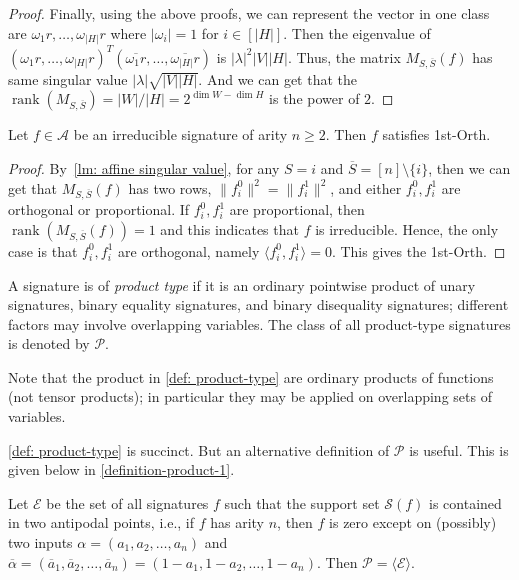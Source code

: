 \begin{proof}
   Finally, using the above proofs, we can represent the vector in one class are $\omega_1r,\dots,\omega_{|H|}r$ where $|\omega_i|=1$ for $i\in [|H|]$. Then the eigenvalue of $(\omega_1r,\dots,\omega_{|H|}r)^T(\overline{\omega_1r},\dots,\overline{\omega_{|H|}r})$ is $|\lambda|^2|V||H|$. Thus, the matrix $M_{S,\overline{S}}(f)$ has same singular value $|\lambda|\sqrt{|V||H|}$. And we can get that the $\operatorname{rank}(M_{S,\overline{S}})=|W|/|H|=2^{\dim W-\dim H}$ is the power of $2$.
    
\end{proof}

\begin{lemma}\label{lm: affine is 1st-orth}
    Let $f\in \mathscr{A}$ be an irreducible signature of arity $n\ge 2$.
    Then $f$ satisfies {\sc 1st-Orth}.
\end{lemma}
\begin{proof}
    By~\cref{lm: affine singular value}, for any $S={i}$ and $\overline{S}=[n]\setminus \{i\}$, then we can get that $M_{S,\overline{S}}(f)$ has two rows, $\|f_i^0\|^2=\|f_i^1\|^2$, and either $f_i^0,f_i^1$ are orthogonal or proportional. If $f_i^0,f_i^1$ are proportional, then $\operatorname{rank}(M_{S,\overline{S}}(f))=1$ and this indicates that $f$ is irreducible. Hence, the only case is that $f_i^0,f_i^1$ are orthogonal, namely $\langle f_i^0,f_i^1\rangle=0$. This gives the {\sc 1st-Orth}.
\end{proof}

\begin{definition}\label{def: product-type}
A signature is of \emph{product type} if it is an ordinary pointwise
product of unary signatures, binary equality signatures, and binary
disequality signatures; different factors may involve overlapping
variables.  The class of all product-type signatures is denoted by
$\mathscr P$.
\end{definition}

Note that the product in \cref{def: product-type} are ordinary products of functions (not tensor products); in particular they may be applied on overlapping sets of variables.

\cref{def: product-type} is succinct.
But an alternative definition of $\mathscr{P}$ is
useful. This is given below in \cref{definition-product-1}.
\begin{definition}\label{definition-product-1}
Let $\mathcal{E}$ be the set of all signatures $f$ such that
the support set
$\mathscr{S}(f)$ is contained in two antipodal points, i.e.,
if $f$ has arity $n$,
then $f$ is zero except on (possibly) two inputs $\alpha
= (a_1, a_2, \ldots, a_n)$
and $\overline{\alpha} =
(\overline{a}_1, \overline{a}_2, \ldots, \overline{a}_n)=(1- a_1, 1- a_2,
 \ldots, 1 - a_n)$.
Then $\mathscr{P}=\langle \mathcal{E}\rangle$.
\end{definition}

